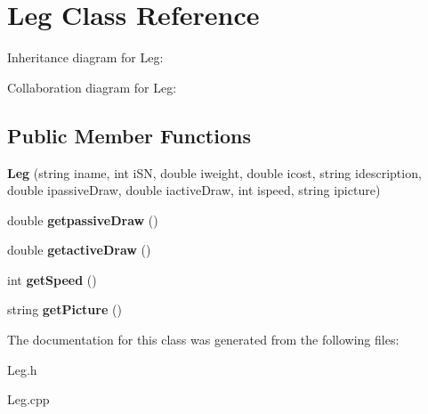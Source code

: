 \hypertarget{classLeg}{}\section{Leg Class Reference}
\label{classLeg}


Inheritance diagram for Leg\+:


Collaboration diagram for Leg\+:
\subsection*{Public Member Functions}
\begin{DoxyCompactItemize}
\item 
{\bfseries Leg} (string iname, int i\+SN, double iweight, double icost, string idescription, double ipassive\+Draw, double iactive\+Draw, int ispeed, string ipicture)\hypertarget{classLeg_a08e3e7bb8a32835913e0422673615e92}{}\label{classLeg_a08e3e7bb8a32835913e0422673615e92}

\item 
double {\bfseries getpassive\+Draw} ()\hypertarget{classLeg_ae3741d64a389905d71ae63c9624eb1e7}{}\label{classLeg_ae3741d64a389905d71ae63c9624eb1e7}

\item 
double {\bfseries getactive\+Draw} ()\hypertarget{classLeg_a92cfd191901e713814b08e54ef710cc1}{}\label{classLeg_a92cfd191901e713814b08e54ef710cc1}

\item 
int {\bfseries get\+Speed} ()\hypertarget{classLeg_a43c5c6614c93691eeaee88d9c47a45cd}{}\label{classLeg_a43c5c6614c93691eeaee88d9c47a45cd}

\item 
string {\bfseries get\+Picture} ()\hypertarget{classLeg_a64d88db0247a536dc2e82c645b8cdc27}{}\label{classLeg_a64d88db0247a536dc2e82c645b8cdc27}

\end{DoxyCompactItemize}


The documentation for this class was generated from the following files\+:\begin{DoxyCompactItemize}
\item 
Leg.\+h\item 
Leg.\+cpp\end{DoxyCompactItemize}
